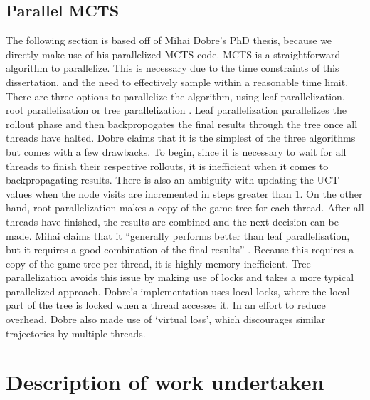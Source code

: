 \documentclass[msc, deptreport, ai, romanprepages]{infthesis}
\begin{document}
\section{Parallel MCTS}
The following section is based off of Mihai Dobre’s PhD thesis, because we directly make use of his parallelized MCTS code. MCTS is a straightforward algorithm to parallelize. This is necessary due to the time constraints of this dissertation, and the need to effectively sample within a reasonable time limit. There are three options to parallelize the algorithm, using leaf parallelization, root parallelization or tree parallelization \cite{Mihai}. Leaf parallelization parallelizes the rollout phase and then backpropogates the final results through the tree once all threads have halted. Dobre claims that it is the simplest of the three algorithms but comes with a few drawbacks. To begin, since it is necessary to wait for all threads to finish their respective rollouts, it is inefficient when it comes to backpropagating results. There is also an ambiguity with updating the UCT values when the node visits are incremented in steps greater than 1. On the other hand, root parallelization makes a copy of the game tree for each thread. After all threads have finished, the results are combined and the next decision can be made. Mihai claims that it “generally performs better than leaf parallelisation, but it requires a good combination of the final results” \cite{Mihai}. Because this requires a copy of the game tree per thread, it is highly memory inefficient. Tree parallelization avoids this issue by making use of locks and takes a more typical parallelized approach. Dobre’s implementation uses local locks, where the local part of the tree is locked when a thread accesses it. In an effort to reduce overhead, Dobre also made use of ‘virtual loss’, which discourages similar trajectories by multiple threads.

\chapter{Description of work undertaken}
\end{document}
